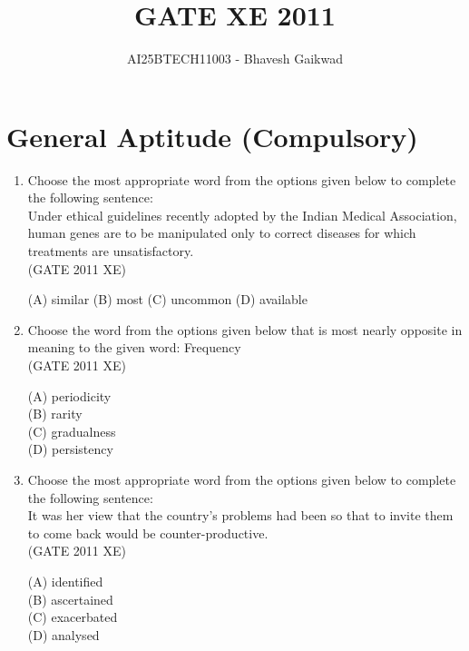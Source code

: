 \documentclass[journal,12pt,onecolumn]{IEEEtran}
\begin{document}
\title{GATE XE 2011}
\author{AI25BTECH11003 - Bhavesh Gaikwad}
\maketitle

\section*{General Aptitude (Compulsory)}
\bigskip
\begin{enumerate}

\item Choose the most appropriate word from the options given below to complete the following sentence: \\
Under ethical guidelines recently adopted by the Indian Medical Association, human genes are to be manipulated only to correct diseases for which treatments are unsatisfactory.\\

\hfill{(GATE 2011 XE)} \\
\begin{multicols}{4}
(A) similar 
(B) most 
(C) uncommon 
(D) available
\end{multicols}

\item Choose the word from the options given below that is most nearly opposite in meaning to the given word: Frequency\\

\hfill{(GATE 2011 XE)} \\
\begin{multicols}{4}
(A) periodicity \\
(B) rarity \\
(C) gradualness \\
(D) persistency
\end{multicols}

\item Choose the most appropriate word from the options given below to complete the following sentence: \\
It was her view that the country's problems had been so that to invite them to come back would be counter-productive. \\

\hfill{(GATE 2011 XE)} \\
\begin{multicols}{4}
(A) identified \\
(B) ascertained \\
(C) exacerbated \\
(D) analysed
\end{multicols}


\end{enumerate}
\end{document}
